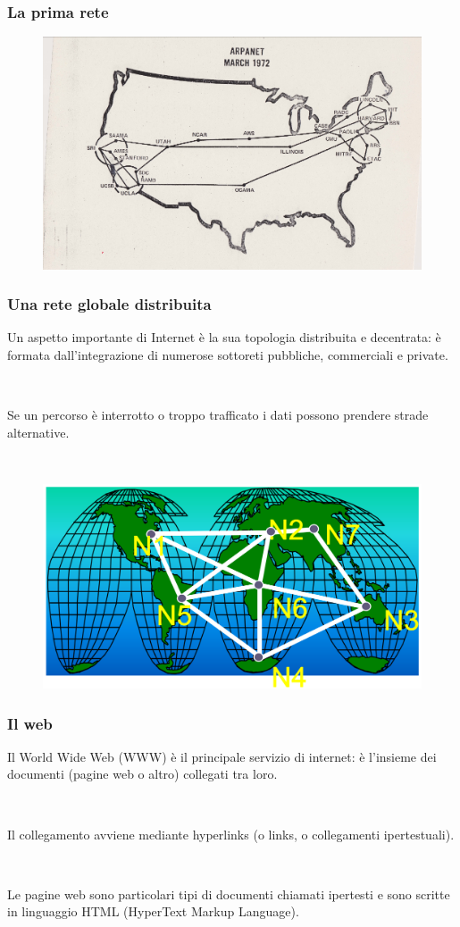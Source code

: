 \documentclass[]{beamer}
\begin{document}
\begin{frame}
\frametitle{La prima rete}
\begin{figure}
    \includegraphics[width=.9\columnwidth]{img/arpanet.png}
  \end{figure}
\end{frame}


\begin{frame}
\frametitle{Una rete globale distribuita}
Un aspetto importante di Internet è la sua \alert<1>{topologia distribuita e decentrata}: è formata dall'integrazione di numerose sottoreti pubbliche, commerciali e private.\pause

~

Se un percorso è interrotto o troppo trafficato i dati possono prendere strade alternative.

~

\begin{figure}
  \includegraphics[width=.5\columnwidth]{img/percorsi.png}
\end{figure}
\end{frame}


\begin{frame}
\frametitle{Il web}
Il \alert<1->{World Wide Web} (WWW) è il principale servizio di internet: è l'insieme dei documenti (pagine web o altro) collegati tra loro.\pause

~

Il collegamento avviene mediante \alert<2>{hyperlinks} (o links, o collegamenti ipertestuali).\pause

~

Le pagine web sono particolari tipi di documenti chiamati \alert<3>{ipertesti} e sono scritte in linguaggio HTML (HyperText Markup Language).
\end{frame}
\end{document}
